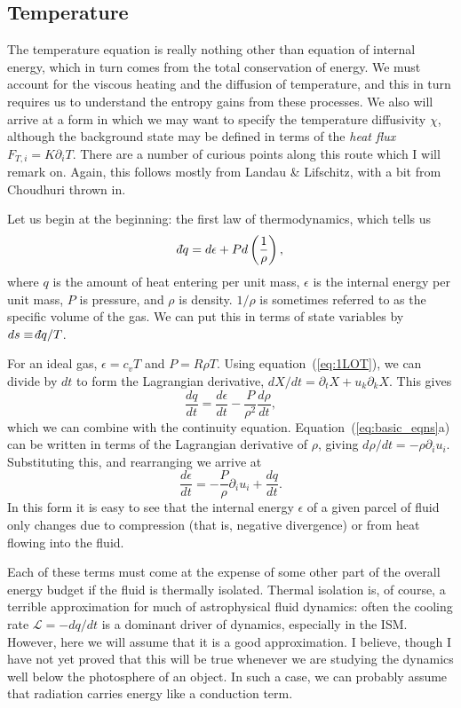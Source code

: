 \documentclass[letterpaper,12pt]{paper}
\def\dbar{{\mathchar'26\mkern-12mu d}}
\begin{document}
\subsection{Temperature}
\label{sec:temp}
The temperature equation is really nothing other than equation of
internal energy, which in turn comes from the total conservation of
energy. We must account for the viscous heating and the diffusion of
temperature, and this in turn requires us to understand the entropy
gains from these processes. We also will arrive at a form in which we
may want to specify the temperature diffusivity $\chi$, although the
background state may be defined in terms of the \emph{heat flux} $F_{T,i} =
K \partial_i T$. There are a number of curious points along this route
which I will remark on. Again, this follows mostly from Landau \&
Lifschitz, with a bit from Choudhuri thrown in.

Let us begin at the beginning: the first law of thermodynamics, which
tells us 
\begin{equation}
  \label{eq:1LOT}
  \dbar q = d\epsilon + P d \left(\frac{1}{\rho}\right),
\end{equation}
where $q$ is the amount of heat entering per unit mass, $\epsilon$ is
the internal energy per unit mass, $P$ is pressure, and $\rho$ is
density. $1/\rho$ is sometimes referred to as the specific volume of
the gas. We can put this in terms of state variables by
$ds \equiv \dbar q/T$. 

For an ideal gas, $\epsilon = c_v T$ and $P  = R \rho T$. Using
equation~(\ref{eq:1LOT}), we can divide by $dt$ to form the Lagrangian
derivative, $dX/dt = \partial_t X + u_k \partial_k X$. This gives
\begin{equation}
  \label{eq:heat}
  \frac{dq}{dt} = \frac{d\epsilon}{dt} - \frac{P}{\rho^2} \frac{d\rho}{dt},
\end{equation}
which we can combine with the continuity
equation. Equation~(\ref{eq:basic_eqns}a) can be written in terms of
the Lagrangian derivative of $\rho$, giving $d\rho/dt =
-\rho \partial_i u_i$. Substituting this, and rearranging we arrive at
\begin{equation}
  \label{eq:int_en}
  \frac{d\epsilon}{dt} = - \frac{P}{\rho} \partial_i u_i + \frac{dq}{dt}.
\end{equation}
In this form it is easy to see that the internal energy $\epsilon$ of
a given parcel of fluid only changes due to compression (that is,
negative divergence) or from heat flowing into the fluid. 

Each of these terms must come at the expense of some other part of the
overall energy budget if the fluid is thermally isolated. Thermal
isolation is, of course, a terrible approximation for much of
astrophysical fluid dynamics: often the cooling rate
$\mathcal{L} = - dq/dt$ is a dominant driver of dynamics, especially
in the ISM. However, here we will assume that it is a good
approximation. I believe, though I have not yet proved that this will
be true whenever we are studying the dynamics well below the
photosphere of an object. In such a case, we can probably assume that
radiation carries energy like a conduction term.
\end{document}
